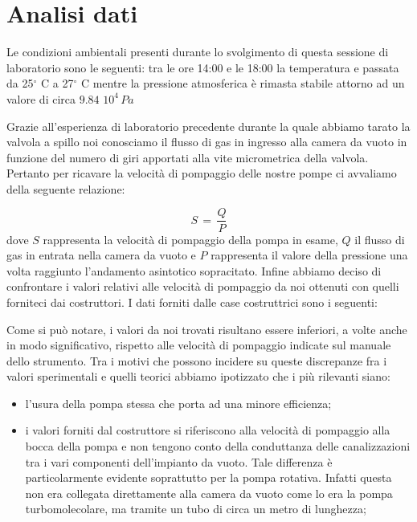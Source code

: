 \section{Analisi dati}

Le condizioni ambientali presenti durante lo svolgimento di questa sessione di laboratorio sono le seguenti: tra le ore 14:00 e le 18:00 la temperatura e passata da 25$^\circ$ C a 27$^\circ$ C mentre la pressione atmosferica è rimasta stabile attorno ad un valore di circa $9.84\,\,10^4\, Pa$

Grazie all'esperienza di laboratorio precedente durante la quale abbiamo tarato la valvola a spillo noi conosciamo il flusso di gas in ingresso alla camera da vuoto in funzione del numero di giri apportati alla vite micrometrica della valvola.
Pertanto per ricavare la velocità di pompaggio delle nostre pompe ci avvaliamo della seguente relazione:

\begin{equation}
	S \,=\, \frac{Q}{P}
\end{equation}
%
dove $S$ rappresenta la velocità di pompaggio della pompa in esame, $Q$ il flusso di gas in entrata nella camera da vuoto e $P$ rappresenta il valore della pressione una volta raggiunto l'andamento asintotico sopracitato. 
%
%
%
%
Infine abbiamo deciso di confrontare i valori relativi alle velocità di pompaggio da noi ottenuti con quelli forniteci dai costruttori. I dati forniti dalle case costruttrici sono i seguenti:
%
%

Come si può notare, i valori da noi trovati risultano essere inferiori, a volte anche in modo significativo, rispetto alle velocità di pompaggio indicate sul manuale dello strumento.
Tra i motivi che possono incidere su queste discrepanze fra i valori sperimentali e quelli teorici abbiamo ipotizzato che i più rilevanti siano:

\begin{itemize}
	\item{l'usura della pompa stessa che porta ad una minore efficienza;}
	\item{i valori forniti dal costruttore si riferiscono alla velocità di pompaggio alla bocca della pompa e non tengono conto della conduttanza delle canalizzazioni tra i vari componenti dell'impianto da vuoto. Tale differenza è particolarmente evidente soprattutto per la pompa rotativa. Infatti questa non era collegata direttamente alla camera da vuoto come lo era la pompa turbomolecolare, ma tramite un tubo di circa un metro di lunghezza;}%
\end{itemize}

